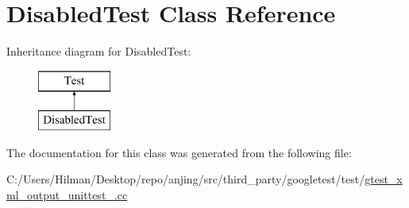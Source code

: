 \hypertarget{class_disabled_test}{}\section{Disabled\+Test Class Reference}
\label{class_disabled_test}
Inheritance diagram for Disabled\+Test\+:\begin{figure}[H]
\begin{center}
\leavevmode
\includegraphics[height=2.000000cm]{class_disabled_test}
\end{center}
\end{figure}


The documentation for this class was generated from the following file\+:\begin{DoxyCompactItemize}
\item 
C\+:/\+Users/\+Hilman/\+Desktop/repo/anjing/src/third\+\_\+party/googletest/test/\hyperlink{gtest__xml__output__unittest___8cc}{gtest\+\_\+xml\+\_\+output\+\_\+unittest\+\_\+.\+cc}\end{DoxyCompactItemize}
